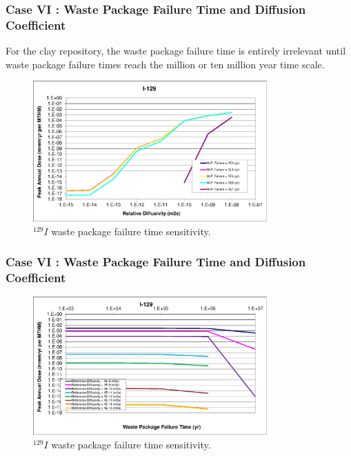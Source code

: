 \begin{frame}[c]
  \frametitle{Case VI : Waste Package Failure Time and Diffusion Coefficient}

For the clay repository, the waste package failure time is entirely irrelevant 
until waste package failure times reach the million or ten million year time 
scale. 

\begin{figure}[ht!]
\centering
\includegraphics[width=0.8\textwidth]{WPFailExtended/I-129.eps}
\caption{$^{129}I$ waste package failure time sensitivity. }
\label{fig:WPFailI129}
\end{figure}
\end{frame}

\begin{frame}[c]
  \frametitle{Case VI : Waste Package Failure Time and Diffusion Coefficient}

\begin{figure}[ht!]
\centering
\includegraphics[width=0.8\textwidth]{WPFailExtended/I-129-WPFail.eps}
\caption{$^{129}I$ waste package failure time sensitivity. }
\label{fig:WPFailI129}
\end{figure}
\end{frame}

